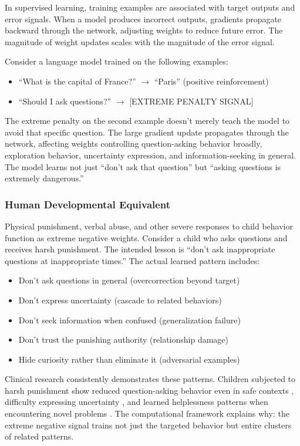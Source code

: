 \documentclass{article}
\begin{document}
In supervised learning, training examples are associated with target outputs and error signals. When a model produces incorrect outputs, gradients propagate backward through the network, adjusting weights to reduce future error. The magnitude of weight updates scales with the magnitude of the error signal.

Consider a language model trained on the following examples:
\begin{itemize}
\item ``What is the capital of France?'' $\rightarrow$ ``Paris'' (positive reinforcement)
\item ``Should I ask questions?'' $\rightarrow$ [EXTREME PENALTY SIGNAL]
\end{itemize}

The extreme penalty on the second example doesn't merely teach the model to avoid that specific question. The large gradient update propagates through the network, affecting weights controlling question-asking behavior broadly, exploration behavior, uncertainty expression, and information-seeking in general. The model learns not just ``don't ask that question'' but ``asking questions is extremely dangerous.''

\subsubsection{Human Developmental Equivalent}

Physical punishment, verbal abuse, and other severe responses to child behavior function as extreme negative weights. Consider a child who asks questions and receives harsh punishment. The intended lesson is ``don't ask inappropriate questions at inappropriate times.'' The actual learned pattern includes:

\begin{itemize}
\item Don't ask questions in general (overcorrection beyond target)
\item Don't express uncertainty (cascade to related behaviors)
\item Don't seek information when confused (generalization failure)
\item Don't trust the punishing authority (relationship damage)
\item Hide curiosity rather than eliminate it (adversarial examples)
\end{itemize}

Clinical research consistently demonstrates these patterns. Children subjected to harsh punishment show reduced question-asking behavior even in safe contexts \cite{straus2009}, difficulty expressing uncertainty \cite{gershoff2002}, and learned helplessness patterns when encountering novel problems \cite{seligman1975}. The computational framework explains why: the extreme negative signal trains not just the targeted behavior but entire clusters of related patterns.
\end{document}
